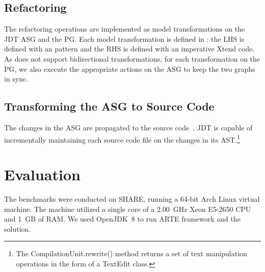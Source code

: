 \documentclass[submission,copyright,creativecommons]{eptcs}
\begin{document}
\subsection{Refactoring}

The refactoring operations are implemented as model transformations on the JDT ASG and the PG. Each model transformation is defined in \viatra: the LHS is defined with an \eiq pattern and the RHS is defined with an imperative Xtend code. As \viatra does not support bidirectional transformations, for each transformation on the PG, we also execute the appropriate actions on the ASG to keep the two graphs in sync.

\subsection{Transforming the ASG to Source Code}


The changes in the ASG are propagated to the source code~. JDT is capable of incrementally maintaining each source code file on the changes in its AST.\footnote{The \textsf{CompilationUnit.rewrite()} method returns a set of text manipulation operations in the form of a \textsf{TextEdit} class.}

\section{Evaluation}

The benchmarks were conducted on SHARE, running a 64-bit Arch Linux virtual machine. The machine utilized a single core of a 2.00~GHz Xeon E5-2650 CPU and 1~GB of RAM. We used OpenJDK~8 to run ARTE framework and the solution.
\end{document}

